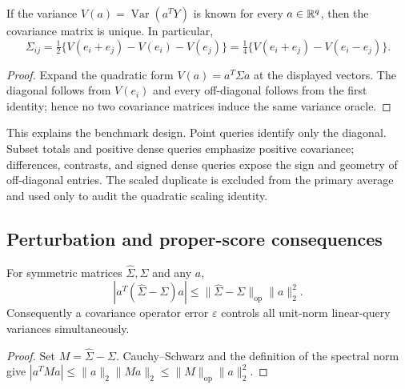 \begin{proposition}\label{prop:polar}
If the variance $V(a)=\operatorname{Var}(a^TY)$ is known for every
$a\in\mathbb{R}^q$, then the covariance matrix is unique.  In particular,
\begin{equation}
 \Sigma_{ij}=\tfrac12\{V(e_i+e_j)-V(e_i)-V(e_j)\}
 =\tfrac14\{V(e_i+e_j)-V(e_i-e_j)\}.
\end{equation}
\end{proposition}
\begin{proof}
Expand the quadratic form $V(a)=a^T\Sigma a$ at the displayed vectors.
The diagonal follows from $V(e_i)$ and every off-diagonal follows from the
first identity; hence no two covariance matrices induce the same variance
oracle.
\end{proof}

This explains the benchmark design.  Point queries identify only the diagonal.
Subset totals and positive dense queries emphasize positive covariance;
differences, contrasts, and signed dense queries expose the sign and geometry
of off-diagonal entries.  The scaled duplicate is excluded from the primary
average and used only to audit the quadratic scaling identity.

\subsection{Perturbation and proper-score consequences}

\begin{proposition}\label{prop:operator}
For symmetric matrices $\widehat\Sigma,\Sigma$ and any $a$,
\begin{equation}
 |a^T(\widehat\Sigma-\Sigma)a|
 \leq \|\widehat\Sigma-\Sigma\|_{\mathrm{op}}\|a\|_2^2.
\end{equation}
Consequently a covariance operator error $\varepsilon$ controls all unit-norm
linear-query variances simultaneously.
\end{proposition}
\begin{proof}
Set $M=\widehat\Sigma-\Sigma$.  Cauchy--Schwarz and the definition of the
spectral norm give $|a^TMa|\leq\|a\|_2\|Ma\|_2
\leq\|M\|_{\mathrm{op}}\|a\|_2^2$.
\end{proof}

